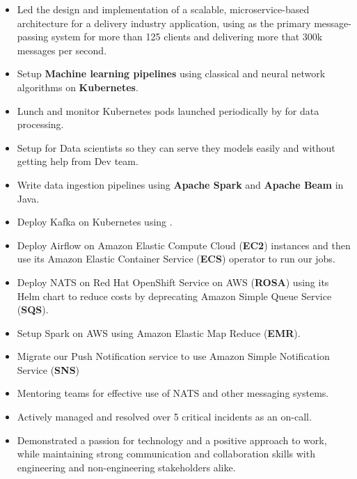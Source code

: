 \begin{itemize}
  \item Led the design and implementation of a scalable, microservice-based architecture for a delivery industry application,
        using  as the primary message-passing system for more than 125 clients and delivering
        more that 300k messages per second.
  \item Setup \textbf{Machine learning pipelines} using classical and neural network algorithms on \textbf{Kubernetes}.
  \item Lunch and monitor Kubernetes pods launched periodically by  for data processing.
  \item Setup  for Data scientists so they can serve they models easily and without getting help from Dev team.
  \item Write data ingestion pipelines using \textbf{Apache Spark} and \textbf{Apache Beam} in Java.
  \item Deploy Kafka on Kubernetes using .
  \item Deploy Airflow on Amazon Elastic Compute Cloud (\textbf{EC2}) instances and then use its Amazon Elastic Container Service (\textbf{ECS}) operator to run our jobs.
  \item Deploy NATS on Red Hat OpenShift Service on AWS (\textbf{ROSA})
        using its Helm chart to reduce costs by deprecating Amazon Simple Queue Service (\textbf{SQS}).
  \item Setup Spark on AWS using Amazon Elastic Map Reduce (\textbf{EMR}).
  \item Migrate our Push Notification service to use Amazon Simple Notification Service (\textbf{SNS})
  \item Mentoring teams for effective use of NATS and other messaging systems.
  \item Actively managed and resolved over 5 critical incidents as an on-call.
  \item Demonstrated a passion for technology and a positive approach to work,
        while maintaining strong communication and collaboration skills with engineering
        and non-engineering stakeholders alike.
\end{itemize}

\vspace{0.5cm}

